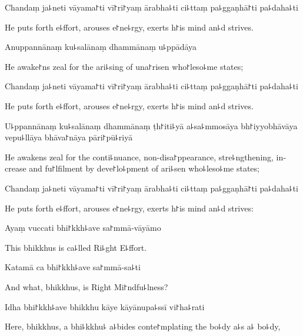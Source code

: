 Chandaṃ ja꜕neti vāyama꜓ti vī꜓ri꜓yaṃ ārabha꜕ti ci꜕ttaṃ pa꜕ggaṇhā꜓ti pa꜕daha꜕ti

\begin{english}
  He puts forth e꜕ffort, arouses e꜓ne꜕rgy, exerts h꜓is mind an꜕d strives.
\end{english}

Anuppannānaṃ ku꜕salānaṃ dhammānaṃ u꜕ppādāya

\begin{english}
  He awake꜓ns zeal for the ari꜕sing of una꜓risen who꜓leso꜕me states;
\end{english}

Chandaṃ ja꜕neti vāyama꜓ti vī꜓ri꜓yaṃ ārabha꜕ti ci꜕ttaṃ pa꜕ggaṇhā꜓ti pa꜕daha꜕ti

\begin{english}
  He puts forth e꜕ffort, arouses e꜓ne꜕rgy, exerts h꜓is mind an꜕d strives.
\end{english}

\ifaivedition
\clearpage
\fi

U꜕ppannānaṃ ku꜕salānaṃ dhammānaṃ ṭh꜓iti꜕yā a꜕sa꜕mmosāya bh꜓iyyobhāvāya vepu꜕llāya bhāva꜓nāya pāri꜓pū꜕riyā

\begin{english}
  He awakens zeal for the conti꜕nuance, non-disa꜓ppearance, stre꜕ngthening, increase and fu꜓lfilment by deve꜓lo꜕pment of ari꜕sen who꜕leso꜕me states;
\end{english}

Chandaṃ ja꜕neti vāyama꜓ti vī꜓ri꜓yaṃ ārabha꜕ti ci꜕ttaṃ pa꜕ggaṇhā꜓ti pa꜕daha꜕ti

\begin{english}
  He puts forth e꜕ffort, arouses e꜓ne꜕rgy, exerts h꜓is mind an꜕d strives:
\end{english}

Ayaṃ vuccati bhi꜓kkh꜕ave sa꜓mmā-vāyāmo

\begin{english}
  This bhikkhus is ca꜕lled Ri꜕ght E꜕ffort.
\end{english}

Katamā ca bhi꜓kkh꜕ave sa꜓mmā-sa꜕ti

\begin{english}
  And what, bhikkhus, is Right Mi꜓ndfu꜕lness?
\end{english}

Idha bhi꜓kkh꜕ave bhikkhu kāye kāyānupa꜕ssī vi꜓ha꜕rati

\begin{english}
  Here, bhikkhus, a bhi꜕kkhu꜕ a꜕bides conte꜓mplating the bo꜕dy a꜕s a꜕ bo꜕dy,
\end{english}

